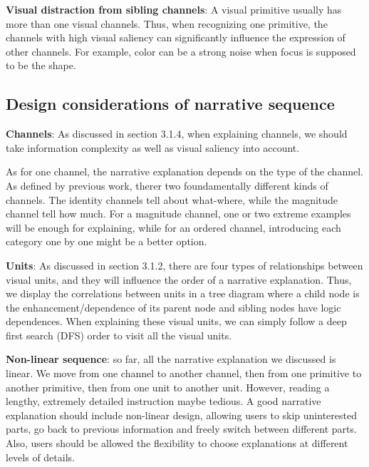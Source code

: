 \textbf{Visual distraction from sibling channels}: A visual primitive usually has more than one visual channels. Thus, when recognizing one primitive, the channels with high visual saliency can significantly influence the expression of other channels. For example, color can be a strong noise when focus is supposed to be the shape.

\subsection{Design considerations of narrative sequence}
\textbf{Channels}: As discussed in section 3.1.4, when explaining channels, we should take information complexity as well as visual saliency into account. 

As for one channel, the narrative explanation depends on the type of the channel. As defined by previous work, therer two foundamentally different kinds of channels. The identity channels tell about what-where, while the magnitude channel tell how much. For a magnitude channel, one or two extreme examples will be enough for explaining, while for an ordered channel, introducing each category one by one might be a better option.\par
\textbf{Units}: As discussed in section 3.1.2, there are four types of relationships between visual units, and they will influence the order of a narrative explanation. Thus, we display the correlations between units in a tree diagram where a child node is the enhancement/dependence of its parent node and sibling nodes have logic dependences. When explaining these visual units, we can simply follow a deep first search (DFS) order to visit all the visual units.\par
\textbf{Non-linear sequence}: so far, all the narrative explanation we discussed is linear. We move from one channel to another channel, then from one primitive to another primitive, then from one unit to another unit. However, reading a lengthy, extremely detailed instruction maybe tedious. A good narrative explanation should include non-linear design, allowing users to skip uninterested parts, go back to previous information and freely switch between different parts. Also, users should be allowed the flexibility to choose explanations at different levels of details. 
